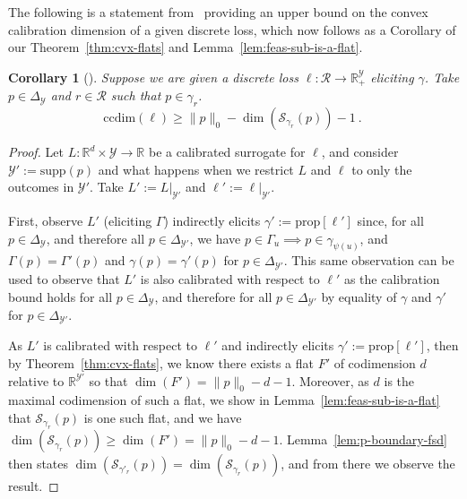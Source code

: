 \documentclass{article}
\newcommand{\reals}{\mathbb{R}}
\newcommand{\simplex}{\Delta_\Y}
\newcommand{\relint}[1]{\mathrm{relint}(#1)}
\newcommand{\prop}[1]{\mathrm{prop}[#1]}
\newcommand{\ccdim}{\mathrm{ccdim}}
\newcommand{\supp}{\mathrm{supp}}
\newcommand{\R}{\mathcal{R}}
\renewcommand{\S}{\mathcal{S}}
\newcommand{\Y}{\mathcal{Y}}
\newtheorem{corollary}{Corollary}
\begin{document}
The following is a statement from~\cite{ramaswamy2016convex} providing an upper bound on the convex calibration dimension of a given discrete loss, which now follows as a Corollary of our Theorem~\ref{thm:cvx-flats} and Lemma~\ref{lem:feas-sub-is-a-flat}.

\begin{corollary}[\cite{ramaswamy2016convex}]
	Suppose we are given a discrete loss $\ell:\R \to \reals^\Y_+$ eliciting $\gamma$.
	Take $p \in \simplex$ and $r \in \R$ such that $p \in \gamma_r$.
	\begin{equation}
	\ccdim(\ell) \geq \|p\|_0 - \dim(\S_{\gamma_r}(p)) - 1~.~
	\end{equation}
\end{corollary}
\begin{proof}
	Let $L : \reals^d \times \Y \to \reals$ be a calibrated surrogate for $\ell$, and consider $\Y' := \supp(p)$ and what happens when we restrict $L$ and $\ell$ to only the outcomes in $\Y'$.
	Take $L' := L|_{\Y'}$ and $\ell' := \ell|_{\Y'}$.
	
	First, observe $L'$ (eliciting $\Gamma$) indirectly elicits $\gamma' := \prop{\ell'}$ since, for all $p \in \simplex$, and therefore all $p \in \Delta_{\Y'}$, we have $p \in \Gamma_u \implies p \in \gamma_{\psi(u)}$, and $\Gamma(p) = \Gamma'(p)$ and $\gamma(p) = \gamma'(p)$ for $p \in \Delta_{\Y'}$.
	This same observation can be used to observe that $L'$ is also calibrated with respect to $\ell'$ as the calibration bound holds for all $p \in \simplex$, and therefore for all $p \in \Delta_{\Y'}$ by equality of $\gamma$ and $\gamma'$ for $p \in \Delta_{\Y'}$.
	
	As $L'$ is calibrated with respect to $\ell'$ and indirectly elicits $\gamma' := \prop{\ell'}$, then by Theorem~\ref{thm:cvx-flats}, we know there exists a flat $F'$ of codimension $d$ relative to $\reals^{\Y'}$ so that $\dim(F') = \|p\|_0 - d - 1$.
	Moreover, as $d$ is the maximal codimension of such a flat, we show in Lemma~\ref{lem:feas-sub-is-a-flat} that $\S_{\gamma_r}(p)$ is one such flat, and we have $\dim(\S_{\gamma_r}(p)) \geq \dim(F') = \|p\|_0 - d- 1$.
	Lemma~\ref{lem:p-boundary-fsd} then states $\dim(\S_{\gamma'_r}(p)) = \dim(\S_{\gamma_r}(p))$, and from there we observe the result.
	


\end{proof}
\end{document}
